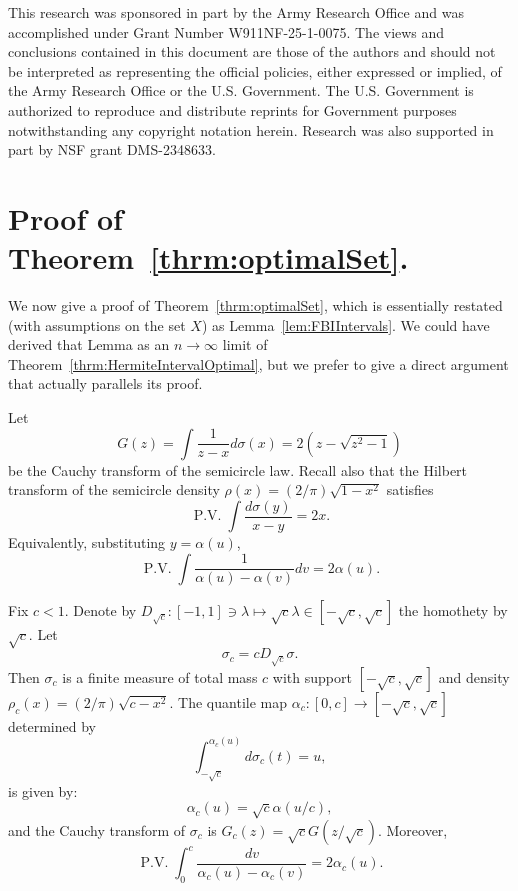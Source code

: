 This research was sponsored in part by the Army Research Office and was accomplished under Grant
Number W911NF-25-1-0075. The views and conclusions contained in this document are those of the authors and
should not be interpreted as representing the official policies, either expressed or implied, of the Army Research
Office or the U.S. Government. The U.S. Government is authorized to reproduce and distribute reprints for
Government purposes notwithstanding any copyright notation herein.
Research was also supported in part by NSF grant DMS-2348633.

\section{Proof of Theorem~\ref{thrm:optimalSet}.}\label{sec:proofoFtheoremOptimalSet}
We now give a proof of Theorem~\ref{thrm:optimalSet}, which is essentially restated (with assumptions on the set $X$) as  Lemma~\ref{lem:FBIIntervals}. We could have derived that Lemma as an $n\to\infty$ limit of Theorem~\ref{thrm:HermiteIntervalOptimal}, but we prefer to give a direct argument that actually parallels its proof.

Let $$G(z) = \int \frac{1}{z-x} d\sigma(x) = 2 ( z - \sqrt{z^2 -1})$$ be the Cauchy transform of the semicircle law. Recall also that the Hilbert transform of the semicircle density $\rho(x) = (2/\pi) \sqrt{1-x^2}$ satisfies
$$
\operatorname{P.V.} \int \frac{d\sigma(y)}{x-y} = 2x.
$$
Equivalently, substituting $y=\alpha(u)$, $$
\operatorname{P.V.} \int \frac{1}{\alpha(u)-\alpha(v)}dv = 2 \alpha(u).$$


Fix $c<1$. Denote by $D_{\sqrt{c}} : [-1,1] \ni 
\lambda\mapsto \sqrt{c}\lambda 
\in [-\sqrt{c},\sqrt{c}]$ 
the homothety by $\sqrt{c}$.  Let $$\sigma_c = c D_{\sqrt{c}} \sigma.$$  
Then $\sigma_c$ is a finite measure of total mass $c$ with support $[-\sqrt{c},\sqrt{c}]$ and density $\rho_c(x) = (2/\pi) \sqrt{c-x^2}$.  The quantile map $\alpha_c : [0,c]\to[-\sqrt{c},\sqrt{c}]$ determined by $$\int_{-\sqrt{c}}^{\alpha_c(u)} d\sigma_c(t) = u,$$ is given by: $$
\alpha_c(u) = \sqrt{c}\alpha(u/c),$$ and the Cauchy transform of $\sigma_c$ is $G_c(z) = \sqrt{c} G(z/\sqrt{c})$. Moreover, 
\begin{equation} \label{eq:StieltjesForSigma_c}\operatorname{P.V.} \int_{0}^c \frac{dv}{\alpha_c(u)-\alpha_c(v)} =2\alpha_c(u).\end{equation}


